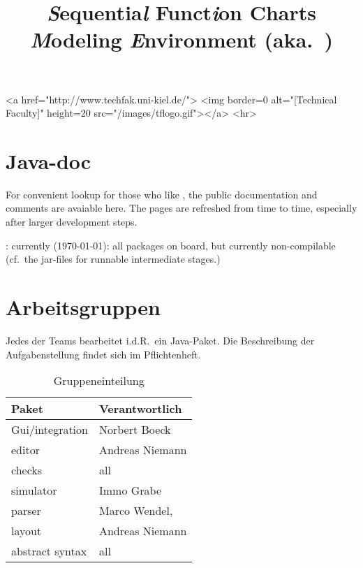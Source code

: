 \documentclass[11pt,german]{article}
\title{{\huge\bf \textsl{S}equentia\textsl{l} Funct\textsl{i}on Charts
    \textsl{M}odeling \textsl{E}nvironment (aka.\ \Slime)}}
\date{}
\begin{document}
\vspace{-2cm}



\begin{rawhtml}
<a href="http://www.techfak.uni-kiel.de/">
  <img border=0 alt="[Technical Faculty]" height=20  src="/images/tflogo.gif"></a>
<hr>
\end{rawhtml}


\maketitle{}






\section*{Java-doc}
\label{sec:javadoc}
\label{sec:html-doc}



For convenient lookup for those who like \javadoc, the public documentation
and comments are avaiable here. The pages are refreshed from time to time,
especially after larger development steps.

\begin{center}
  : currently (\today): all
  packages on board, but currently non-compilable (cf.\ the jar-files for
  runnable intermediate stages.)
\end{center}

















\section*{Arbeitsgruppen}
\label{sec:gruppen}

Jedes der Teams bearbeitet i.d.R.\ ein Java-Paket. Die Beschreibung der
Aufgabenstellung findet sich im Pflichtenheft.

\begin{table}[htbp]
  \centering
  \begin{tabular}[t]{l@{\quad\quad}l}
     Paket  &  Verantwortlich
     \\\hline
     Gui/integration & Norbert Boeck
     \\
     editor & Andreas Niemann
     \\
     checks & all
     \\
     simulator & Immo Grabe
     \\
     parser & Marco Wendel,
     \\
     layout & Andreas Niemann
     \\
     abstract syntax & all
  \end{tabular}
  \caption{Gruppeneinteilung}
  \label{tab:gruppen}
\end{table}
\end{document}
